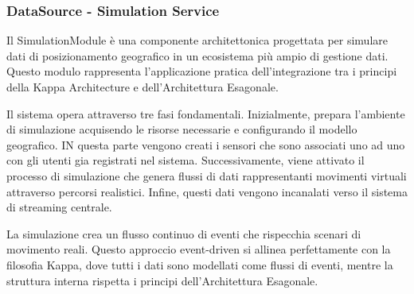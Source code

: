 \documentclass[10pt]{article}
\newcommand{\myparagraph}[1]{\paragraph{#1}\mbox{}\\}
\newcommand{\mysubparagraph}[1]{\subparagraph{#1}\mbox{}\\}
\begin{document}
        \subsubsection{DataSource - Simulation Service}
        Il SimulationModule è una componente architettonica progettata per simulare dati di posizionamento geografico in un ecosistema più ampio di gestione dati. Questo modulo rappresenta l'applicazione pratica dell'integrazione tra i principi della Kappa Architecture e dell'Architettura Esagonale.

        
        Il sistema opera attraverso tre fasi fondamentali. Inizialmente, prepara l'ambiente di simulazione acquisendo le risorse necessarie e configurando il modello geografico. IN questa parte vengono creati i sensori che sono associati uno ad uno con gli utenti gia registrati nel sistema. Successivamente, viene attivato il processo di simulazione che genera flussi di dati rappresentanti movimenti virtuali attraverso percorsi realistici. Infine, questi dati vengono incanalati verso il sistema di streaming centrale.

        La simulazione crea un flusso continuo di eventi che rispecchia scenari di movimento reali. Questo approccio event-driven si allinea perfettamente con la filosofia Kappa, dove tutti i dati sono modellati come flussi di eventi, mentre la struttura interna rispetta i principi dell'Architettura Esagonale.




\end{document}
